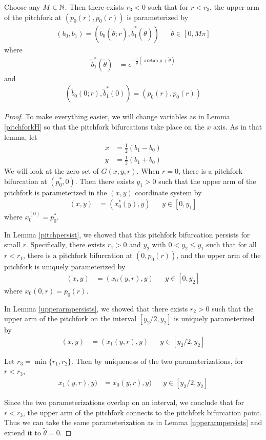 \documentclass[thesis.tex]{subfiles}
\begin{document}
\begin{lemma}\label{pitchforkconnects}
Choose any $M \in {\mathbb N}$. Then there exists $r_3 < 0$ such that for $r < r_3$, the upper arm of the pitchfork at $(p_0(r), p_0(r))$ is parameterized by
\begin{align*}
(b_0, b_1) = (\tilde{b}_0(\tilde{\theta}; r), \tilde{b}^*_1(\tilde{\theta})) && \tilde{\theta} \in [0, M \pi]
\end{align*}
where
\begin{align*}
\tilde{b}_1^*(\tilde{\theta}) &= e^{-\frac{1}{\rho}(\arctan \rho +\tilde{\theta})} 
\end{align*}
and 
\begin{align*}
(\tilde{b}_0(0; r), \tilde{b}^*_1(0)) = (p_0(r), p_0(r))
\end{align*}

\begin{proof}
To make everything easier, we will change variables as in Lemma \ref{pitchforkH} so that the pitchfork bifurcations take place on the $x$ axis. As in that lemma, let 
\begin{align*}
x &= \frac{1}{2}(b_1 - b_0) \\
y &= \frac{1}{2}(b_1 + b_0)
\end{align*}
We will look at the zero set of $G(x, y, r)$. When $r = 0$, there is a pitchfork bifurcation at $(p_0^*, 0)$. Then there exists $y_1 > 0$ such that the upper arm of the pitchfork is parameterized in the $(x,y)$ coordinate system by 
\begin{align*}
(x, y) &= (x_0^*(y), y) && y \in [0, y_1]
\end{align*}
where $x_0^(0) = p_0^*$. 

In Lemma \ref{pitchpersist}, we showed that this pitchfork bifurcation persists for small $r$. Specifically, there exists $r_1 > 0$ and $y_2$ with $0 < y_2 \leq y_1$ such that for all $r < r_1$, there is a pitchfork bifurcation at $(0, p_0(r))$, and the upper arm of the pitchfork is uniquely parameterized by
\begin{align*}
(x, y) &= (x_0(y, r), y) && y \in [0, y_2]
\end{align*}
where $x_0(0, r) = p_0(r)$. 

In Lemma \ref{upperarmpersists}, we showed that there exists $r_2 > 0$ such that the upper arm of the pitchfork on the interval $[y_2/2, y_2]$ is uniquely parameterized by 
\begin{align*}
(x, y) &= (x_1(y, r), y) && y \in [y_2/2, y_2]
\end{align*}

Let $r_3 = \min\{ r_1, r_2 \}$. Then by uniqueness of the two parameterizations, for $r < r_3$,
\begin{align*}
x_1(y, r), y) &= x_0(y, r), y) && y \in [y_2/2, y_2]
\end{align*}

Since the two parameterizations overlap on an interval, we conclude that for $r < r_3$, the upper arm of the pitchfork connects to the pitchfork bifurcation point. Thus we can take the same parameterization as in Lemma \ref{upperarmpersists} and extend it to $\tilde{\theta} = 0$.

\end{proof}
\end{lemma}
\end{document}
